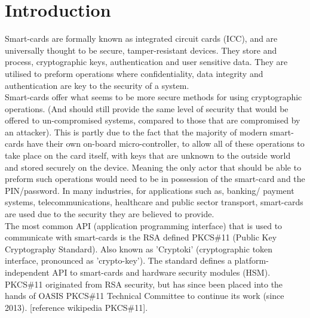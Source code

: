 \documentclass[bsc,frontabs,twoside,singlespacing,parskip,deptreport]{infthesis}     %
\begin{document}


\chapter{Introduction}
Smart-cards are formally known as integrated circuit cards (ICC), and are universally thought to be secure, tamper-resistant devices. They store and process, cryptographic keys, authentication and user sensitive data. They are utilised to preform operations where confidentiality, data integrity and authentication are key to the security of a system.\\

\noindent Smart-cards offer what seems to be more secure methods for using cryptographic operations. (And should still provide the same level of security that would be offered to un-compromised systems, compared to those that are compromised by an attacker). This is partly due to the fact that the majority of modern smart-cards have their own on-board micro-controller, to allow all of these operations to take place on the card itself, with keys that are unknown to the outside world and stored securely on the device. Meaning the only actor that should be able to preform such operations would need to be in possession of the smart-card and the PIN/password. In many industries, for applications such as, banking/ payment systems, telecommunications, healthcare and public sector transport, 
smart-cards are used due to the security they are believed to provide.\\


\noindent The most common API (application programming interface) that is used to communicate with smart-cards is the RSA defined PKCS\#11 (Public Key Cryptography Standard). Also known as 'Cryptoki' (cryptographic token interface, pronounced as 'crypto-key'). The standard defines a platform-independent API to smart-cards and hardware security modules (HSM). PKCS\#11 originated from RSA security, but has since been placed into the hands of OASIS PKCS\#11 Technical Committee to continue its work (since 2013). [reference wikipedia PKCS\#11].\\
\end{document}
